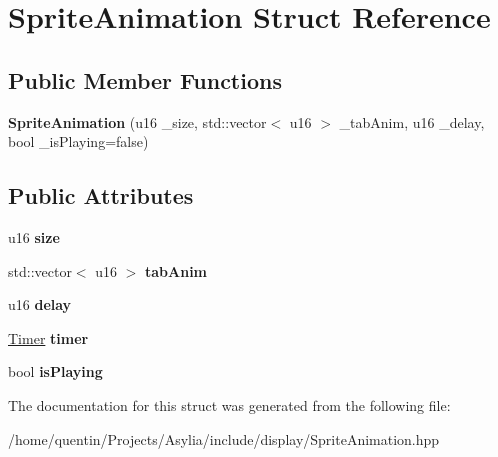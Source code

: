\hypertarget{structSpriteAnimation}{\section{Sprite\-Animation Struct Reference}
\label{structSpriteAnimation}
}
\subsection*{Public Member Functions}
\begin{DoxyCompactItemize}
\item 
\hypertarget{structSpriteAnimation_a714050082b00fdf1fbf7f526c8444422}{{\bfseries Sprite\-Animation} (u16 \-\_\-size, std\-::vector$<$ u16 $>$ \-\_\-tab\-Anim, u16 \-\_\-delay, bool \-\_\-is\-Playing=false)}\label{structSpriteAnimation_a714050082b00fdf1fbf7f526c8444422}

\end{DoxyCompactItemize}
\subsection*{Public Attributes}
\begin{DoxyCompactItemize}
\item 
\hypertarget{structSpriteAnimation_aa547caf0c49262f082865ab9422619ea}{u16 {\bfseries size}}\label{structSpriteAnimation_aa547caf0c49262f082865ab9422619ea}

\item 
\hypertarget{structSpriteAnimation_ab701a6db968f0ded572c40a274947c77}{std\-::vector$<$ u16 $>$ {\bfseries tab\-Anim}}\label{structSpriteAnimation_ab701a6db968f0ded572c40a274947c77}

\item 
\hypertarget{structSpriteAnimation_a8692dae92b2f3f23fb27846fad397f98}{u16 {\bfseries delay}}\label{structSpriteAnimation_a8692dae92b2f3f23fb27846fad397f98}

\item 
\hypertarget{structSpriteAnimation_a7f051b8f289ffd16b226bc2abbd26888}{\hyperlink{classTimer}{Timer} {\bfseries timer}}\label{structSpriteAnimation_a7f051b8f289ffd16b226bc2abbd26888}

\item 
\hypertarget{structSpriteAnimation_a37b4a887ed53f1b808a37dad19083f0e}{bool {\bfseries is\-Playing}}\label{structSpriteAnimation_a37b4a887ed53f1b808a37dad19083f0e}

\end{DoxyCompactItemize}


The documentation for this struct was generated from the following file\-:\begin{DoxyCompactItemize}
\item 
/home/quentin/\-Projects/\-Asylia/include/display/Sprite\-Animation.\-hpp\end{DoxyCompactItemize}
